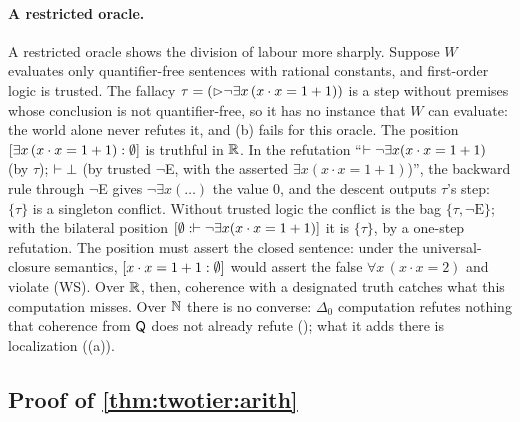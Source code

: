 \paragraph{A restricted oracle.} A restricted oracle shows the division of labour more sharply. Suppose $W$ evaluates only quantifier-free sentences with rational constants, and first-order logic is trusted. The fallacy $\tau=(\rhd\neg\exists x\,(x\cdot x=1+1))$ is a step without premises whose conclusion is not quantifier-free, so it has no instance that $W$ can evaluate: the world alone never refutes it, and (b) fails for this oracle. The position $[\exists x\,(x\cdot x=1+1) : \emptyset]$ is truthful in $\mathbb{R}$. In the refutation ``$\vdash\neg\exists x(x\cdot x=1+1)$ (by $\tau$); $\vdash\bot$ (by trusted $\neg$E, with the asserted $\exists x(x\cdot x=1+1)$)'', the backward rule through $\neg$E gives $\neg\exists x(\dots)$ the value $0$, and the descent outputs $\tau$'s step: $\{\tau\}$ is a singleton conflict. Without trusted logic the conflict is the bag $\{\tau,\neg\mathrm E\}$; with the bilateral position $[\emptyset : \vdash\neg\exists x(x\cdot x=1+1)]$ it is $\{\tau\}$, by a one-step refutation. The position must assert the closed sentence: under the universal-closure semantics, $[x\cdot x=1+1 : \emptyset]$ would assert the false $\forall x\,(x\cdot x=2)$ and violate (WS). Over $\mathbb{R}$, then, coherence with a designated truth catches what this computation misses. Over $\mathbb{N}$ there is no converse: $\Delta_0$ computation refutes nothing that coherence from $\mathsf{Q}$ does not already refute (); what it adds there is localization ((a)).

\subsection{Proof of \texorpdfstring{\cref{thm:twotier:arith}}{the arithmetic theorem}}\label{app:twotier:arith}

